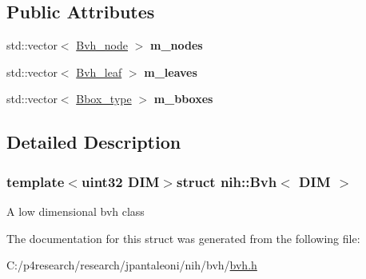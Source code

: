 \subsection*{\-Public \-Attributes}
\begin{DoxyCompactItemize}
\item 
\hypertarget{structnih_1_1_bvh_a6d693413eb1650cea2a33b876196fa3d}{
std\-::vector$<$ \hyperlink{structnih_1_1_bvh__node}{\-Bvh\-\_\-node} $>$ {\bfseries m\-\_\-nodes}}
\label{structnih_1_1_bvh_a6d693413eb1650cea2a33b876196fa3d}

\item 
\hypertarget{structnih_1_1_bvh_a7342b1b0bb29bd01e4e57b2206302be1}{
std\-::vector$<$ \hyperlink{structnih_1_1_bvh__leaf}{\-Bvh\-\_\-leaf} $>$ {\bfseries m\-\_\-leaves}}
\label{structnih_1_1_bvh_a7342b1b0bb29bd01e4e57b2206302be1}

\item 
\hypertarget{structnih_1_1_bvh_a47d320eef626bc51afc989a925cefab4}{
std\-::vector$<$ \hyperlink{structnih_1_1_bbox}{\-Bbox\-\_\-type} $>$ {\bfseries m\-\_\-bboxes}}
\label{structnih_1_1_bvh_a47d320eef626bc51afc989a925cefab4}

\end{DoxyCompactItemize}


\subsection{\-Detailed \-Description}
\subsubsection*{template$<$uint32 \-D\-I\-M$>$struct nih\-::\-Bvh$<$ D\-I\-M $>$}

\-A low dimensional bvh class 

\-The documentation for this struct was generated from the following file\-:\begin{DoxyCompactItemize}
\item 
\-C\-:/p4research/research/jpantaleoni/nih/bvh/\hyperlink{bvh_8h}{bvh.\-h}\end{DoxyCompactItemize}
